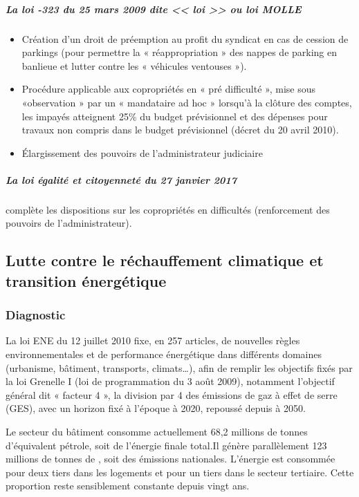 				\subparagraph{La loi -323 du 25 mars 2009 dite << loi  >> ou loi MOLLE}
					\begin{itemize}
						\item Création d’un droit de préemption au profit du syndicat en cas de cession de parkings (pour permettre la « réappropriation » des nappes de parking en banlieue et lutter contre les « véhicules ventouses »).
						
						\item Procédure applicable aux copropriétés en « pré difficulté », mise sous «observation » par un « mandataire ad hoc » lorsqu’à la clôture des comptes, les impayés atteignent 25\% du budget prévisionnel et des dépenses pour travaux non compris dans le budget prévisionnel (décret du 20 avril 2010).
						
						\item Élargissement des pouvoirs de l’administrateur judiciaire
					\end{itemize}
				
				\subparagraph{La loi égalité et citoyenneté du 27 janvier 2017 } complète les dispositions sur les copropriétés en difficultés (renforcement des pouvoirs de l’administrateur).
				
		
		\subsection{Lutte contre le réchauffement climatique et transition énergétique}
		
		\subsubsection{Diagnostic}
			La loi ENE du 12 juillet 2010 fixe, en 257 articles, de nouvelles règles environnementales et de performance énergétique dans différents domaines (urbanisme, bâtiment, transports, climats…), afin de remplir les objectifs fixés par la loi Grenelle I (loi de programmation du 3 août 2009), notamment l’objectif général dit « facteur 4 », la division par 4 des émissions de gaz à effet de serre (GES), avec un horizon fixé à l’époque à 2020, repoussé depuis à 2050.
			
			Le secteur du bâtiment consomme actuellement 68,2 millions de tonnes d'équivalent pétrole, soit  de l'énergie finale total.Il génère parallèlement 123 millions de tonnes de \dioxydeDeCarbone, soit  des émissions nationales. L’énergie est consommée pour deux tiers dans les logements et pour un tiers dans le secteur tertiaire. Cette proportion reste sensiblement constante depuis vingt ans.
			
